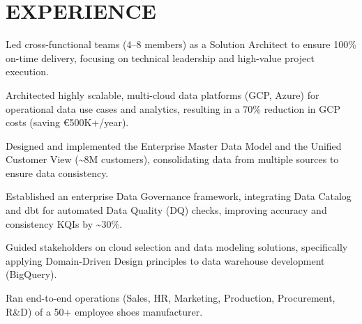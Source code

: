 \documentclass[]{deedy-resume-cv}
\begin{document}
\begin{minipage}[t]{0.60\textwidth}


\section{EXPERIENCE}

\vspace{\topsep} %
\begin{tightemize}
\item Led cross-functional teams (4–8 members) as a Solution Architect to ensure 100\% on-time delivery, focusing on technical leadership and high-value project execution.

\item Architected highly scalable, multi-cloud data platforms (GCP, Azure) for operational data use cases and analytics, resulting in a 70\% reduction in GCP costs (saving €500K+/year).

\item Designed and implemented the Enterprise Master Data Model and the Unified Customer View (\~{}8M customers), consolidating data from multiple sources to ensure data consistency.

\item Established an enterprise Data Governance framework, integrating Data Catalog and dbt for automated Data Quality (DQ) checks, improving accuracy and consistency KQIs by \~{}30\%.

\item Guided stakeholders on cloud selection and data modeling solutions, specifically applying Domain-Driven Design principles to data warehouse development (BigQuery).
\end{tightemize}

\sectionsep
{}
\begin{tightemize}
\item Ran end-to-end operations (Sales, HR, Marketing, Production, Procurement, R\&D) of a 50+ employee shoes manufacturer.


\end{tightemize}
\end{minipage}
\end{document}

